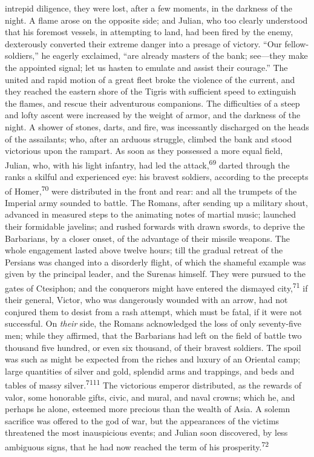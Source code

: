 intrepid diligence, they were lost, after a few moments, in the
darkness of the night. A flame arose on the opposite side; and
Julian, who too clearly understood that his foremost vessels, in
attempting to land, had been fired by the enemy, dexterously
converted their extreme danger into a presage of victory. “Our
fellow-soldiers,” he eagerly exclaimed, “are already masters of
the bank; see—they make the appointed signal; let us hasten to
emulate and assist their courage.” The united and rapid motion of
a great fleet broke the violence of the current, and they reached
the eastern shore of the Tigris with sufficient speed to
extinguish the flames, and rescue their adventurous companions.
The difficulties of a steep and lofty ascent were increased by
the weight of armor, and the darkness of the night. A shower of
stones, darts, and fire, was incessantly discharged on the heads
of the assailants; who, after an arduous struggle, climbed the
bank and stood victorious upon the rampart. As soon as they
possessed a more equal field, Julian, who, with his light
infantry, had led the attack,\textsuperscript{69} darted through the ranks a
skilful and experienced eye: his bravest soldiers, according to
the precepts of Homer,\textsuperscript{70} were distributed in the front and rear:
and all the trumpets of the Imperial army sounded to battle. The
Romans, after sending up a military shout, advanced in measured
steps to the animating notes of martial music; launched their
formidable javelins; and rushed forwards with drawn swords, to
deprive the Barbarians, by a closer onset, of the advantage of
their missile weapons. The whole engagement lasted above twelve
hours; till the gradual retreat of the Persians was changed into
a disorderly flight, of which the shameful example was given by
the principal leader, and the Surenas himself. They were pursued
to the gates of Ctesiphon; and the conquerors might have entered
the dismayed city,\textsuperscript{71} if their general, Victor, who was
dangerously wounded with an arrow, had not conjured them to
desist from a rash attempt, which must be fatal, if it were not
successful. On \textit{their} side, the Romans acknowledged the loss of
only seventy-five men; while they affirmed, that the Barbarians
had left on the field of battle two thousand five hundred, or
even six thousand, of their bravest soldiers. The spoil was such
as might be expected from the riches and luxury of an Oriental
camp; large quantities of silver and gold, splendid arms and
trappings, and beds and tables of massy silver.\textsuperscript{7111} The
victorious emperor distributed, as the rewards of valor, some
honorable gifts, civic, and mural, and naval crowns; which he,
and perhaps he alone, esteemed more precious than the wealth of
Asia. A solemn sacrifice was offered to the god of war, but the
appearances of the victims threatened the most inauspicious
events; and Julian soon discovered, by less ambiguous signs, that
he had now reached the term of his prosperity.\textsuperscript{72}

